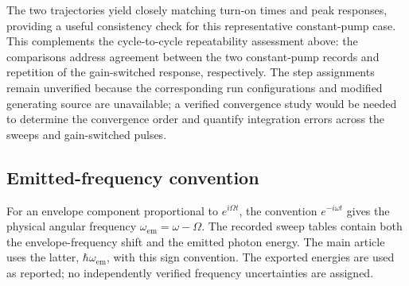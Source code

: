 \documentclass[9pt]{osa-supplemental-document}
\begin{document}
The two trajectories yield closely matching turn-on times and peak responses, providing a useful consistency check for this representative constant-pump case. This complements the cycle-to-cycle repeatability assessment above: the comparisons address agreement between the two constant-pump records and repetition of the gain-switched response, respectively. The step assignments remain unverified because the corresponding run configurations and modified generating source are unavailable; a verified convergence study would be needed to determine the convergence order and quantify integration errors across the sweeps and gain-switched pulses.

\subsection{Emitted-frequency convention}
For an envelope component proportional to $e^{i\Omega t}$, the convention $e^{-i\omega t}$ gives the physical angular frequency $\omega_{\mathrm{em}}=\omega-\Omega$. The recorded sweep tables contain both the envelope-frequency shift and the emitted photon energy. The main article uses the latter, $\hbar\omega_{\mathrm{em}}$, with this sign convention. The exported energies are used as reported; no independently verified frequency uncertainties are assigned.
\end{document}

